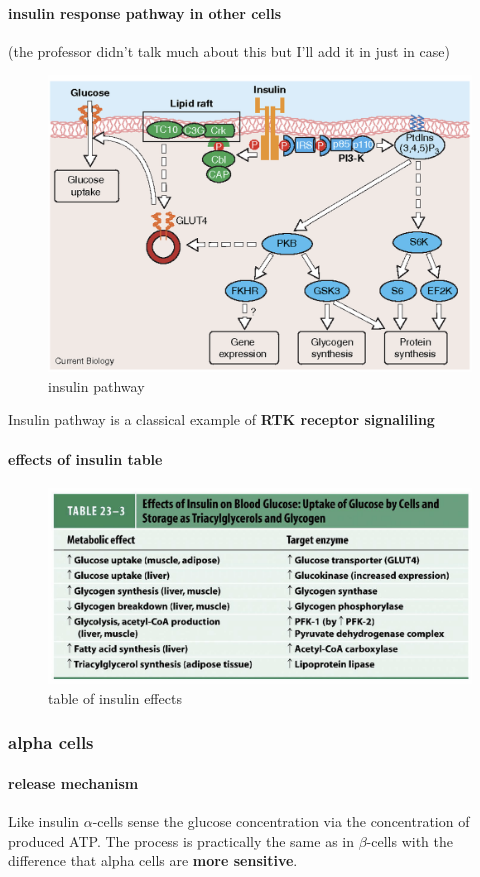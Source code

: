 \documentclass[../main.tex]{subfiles}
\begin{document}
\paragraph{insulin response pathway in other cells}
(the professor didn't talk much about this but I'll add it in just in case)
\begin{figure}[H]
    \centering
    \includegraphics[width=0.7\linewidth]{insulinPathway.png}
    \caption{insulin pathway}
    \label{fig:enter-label}
\end{figure}
Insulin pathway is a classical example of\textbf{ RTK receptor signaliling}
\paragraph{effects of insulin table}
\begin{figure}[H]
    \centering
    \includegraphics[width=\linewidth]{insulinTable.png}
    \caption{table of insulin effects}
    \label{fig:enter-label}
\end{figure}

\subsubsection{alpha cells}
\paragraph{release mechanism}
Like insulin $\alpha$-cells sense the glucose concentration via the concentration of produced ATP. The process is practically the same as in $\beta$-cells with the difference that alpha cells are \textbf{more sensitive}.
\end{document}
